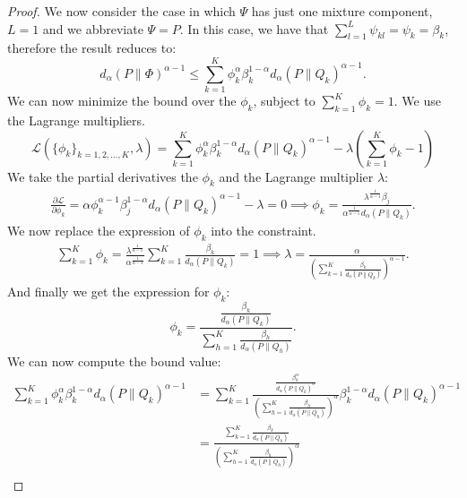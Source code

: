 \documentclass{article}
\begin{document}
\armonic*
\begin{proof}
We now consider the case in which $\Psi$ has just one mixture component, \ie $L = 1$ and we abbreviate $\Psi = P$. In this case, we have that $\sum_{l=1}^L \psi_{kl}= \psi_k = \beta_k$, therefore the result reduces to:
\begin{equation}
     d_{\alpha} (P \| \Phi)^{\alpha-1} \le  \sum_{k=1}^K \phi_{k}^\alpha \beta_{k}^{1-\alpha} d_{\alpha} (P \| Q_k)^{\alpha-1}.
\end{equation}
We can now minimize the bound over the $\phi_k$, subject to $\sum_{k=1}^K \phi_k = 1$. We use the Lagrange multipliers.
    \begin{equation*}
        \mathcal{L}(\{\phi_k\}_{k=1,2,...,K}, \lambda) = \sum_{k=1}^K \phi_{k}^\alpha \beta_{k}^{1-\alpha} d_{\alpha} (P \| Q_k)^{\alpha-1} - \lambda \left( \sum_{k=1}^K \phi_k -1 \right)
    \end{equation*}
    We take the partial derivatives \wrt the $\phi_k$ and the Lagrange multiplier $\lambda$:
    \begin{align*}
        \frac{\partial \mathcal{L}}{\partial \phi_k} = \alpha \phi_k^{\alpha-1} \beta_j^{1-\alpha} d_{\alpha}(P \| Q_k)^{\alpha-1} - \lambda = 0 \implies \phi_k = \frac{\lambda^{\frac{1}{\alpha-1}}  \beta_j}{\alpha^{\frac{1}{\alpha-1}} d_{\alpha}(P \| Q_k)}.
    \end{align*}
    We now replace the expression of $\phi_k$ into the constraint.
    \begin{align*}
        \sum_{k=1}^K \phi_k = \frac{\lambda^\frac{1}{\alpha-1}}{\alpha^\frac{1}{\alpha-1}}  \sum_{k=1}^K \frac{ \beta_k}{ d_{\alpha}(P \| Q_k)} = 1 \implies \lambda = \frac{\alpha}{\left( \sum_{k=1}^K \frac{ \beta_k}{ d_{\alpha}(P \| Q_k)}\right)^{{\alpha-1}}}.
    \end{align*}
    And finally we get the expression for $\phi_k$:
    \begin{equation}
        \phi_k = \frac{\frac{\beta_k}{d_{\alpha}(P \| Q_k)}} {\sum_{h=1}^K \frac{ \beta_h}{ d_{\alpha}(P \| Q_h)}}.
    \end{equation}
    We can now compute the bound value:
    \begin{align*}
        \sum_{k=1}^K \phi_{k}^\alpha \beta_{k}^{1-\alpha} d_{\alpha} (P \| Q_k)^{\alpha-1} & = \sum_{k=1}^K \frac{\frac{\beta_k^{\alpha}}{d_{\alpha}(P \| Q_k)^{\alpha}}} {\left(\sum_{h=1}^K \frac{ \beta_h}{ d_{\alpha}(P \| Q_h)}\right)^{\alpha}} \beta_{k}^{1-\alpha} d_{\alpha} (P \| Q_k)^{\alpha-1} \\
        & = \frac{ \sum_{k=1}^K \frac{\beta_k}{d_{\alpha}(P \| Q_k)} }{\left(\sum_{h=1}^K \frac{ \beta_h}{ d_{\alpha}(P \| Q_h)}\right)^{\alpha}} \\

\end{align*}
\end{proof}
\end{document}

